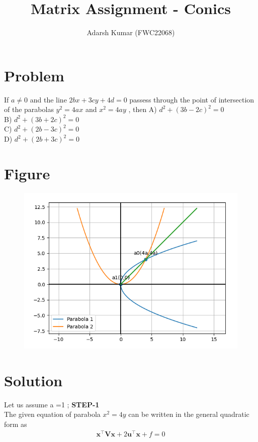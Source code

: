 \documentclass[journal,12pt,twocolumn]{IEEEtran}
\title{\mytitle}
\title{
Matrix Assignment - Conics
}
\author{Adarsh Kumar (FWC22068)}
\let\vec\mathbf
\let\vec\mathbf
\begin{document}
\maketitle
\tableofcontents
\bigskip


\section{\textbf{Problem}}
If $a \neq 0$ and the line $ 2bx+3cy+4d = 0$ passess through the point of intersection of the parabolas $ y^2 =4ax$ and $ x^2=4ay$ , then
\linebreak
A) $d^2 + (3b-2c)^2 =0 $ \\ B) $d^2 + (3b+2c)^2 =0 $\\ C) $d^2 + (2b-3c)^2 =0 $ \\D) $d^2 + (2b+3c)^2 =0 $
\\
\section{\textbf{Figure}}
\begin{figure}[h]
    \centering
\includegraphics[width=\columnwidth]{con.png}
    \label{fig:my_label}
\end{figure}
\section{\textbf{Solution}}

Let us assume a =1 ;
\textbf{STEP-1}\vspace{2mm}\\
The given equation of parabola $x^2 = 4y$ can be written in the general quadratic form as
\begin{align}
    \vec{x}^{\top}\vec{V}\vec{x}+2\vec{u}^{\top}\vec{x}+f=0
    \end{align}
 
\end{document}
